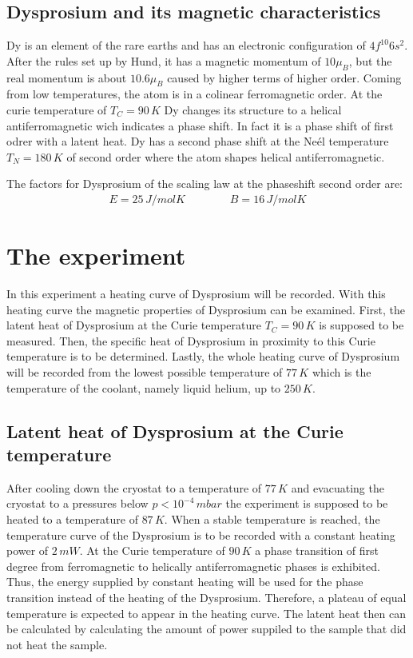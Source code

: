 \documentclass{include/thesisclass3}
\newcommand{\e}[1]{\,\si{#1}}
\begin{document}
\section{Dysprosium and its magnetic characteristics}
Dy is an element of the rare earths and has an electronic configuration of $4f^{10}6s^2$. After the rules set up by Hund, it has a magnetic momentum of $10\mu_B$, but the real momentum is about $10.6\mu_B$ caused by higher terms of higher order.
Coming from low temperatures, the atom is in a colinear ferromagnetic order. At the curie temperature of $T_C=90\e{K}$ Dy changes its structure to a helical antiferromagnetic wich indicates a phase shift. In fact it is a phase shift of first odrer with a latent heat. Dy has a second phase shift at the Neél temperature $T_N=180\e{K}$ of second order where the atom shapes helical antiferromagnetic.

The factors for Dysprosium of the scaling law at the phaseshift second order are:
\begin{align*}
E=25\e{J/mol K}\qquad \qquad B=16\e{J/mol K}
\end{align*}


\chapter{The experiment}
In this experiment a heating curve of Dysprosium will be recorded. 
With this heating curve the magnetic properties of Dysprosium can be examined.
First, the latent heat of Dysprosium at the Curie temperature $T_C = 90 \e{K}$ is supposed to be measured.
Then, the specific heat of Dysprosium in proximity to this Curie temperature is to be determined.
Lastly, the whole heating curve of Dysprosium will be recorded from the lowest possible temperature of $77\e{K}$ which is the temperature of the coolant, namely liquid helium, up to $250\e{K}$.

\section{Latent heat of Dysprosium at the Curie temperature}
After cooling down the cryostat to a temperature of $77\e{K}$ and evacuating the cryostat to a pressures below $p < 10^{-4}\e{mbar}$ the experiment is supposed to be heated to a temperature of $87\e{K}$. 
When a stable temperature is reached, the temperature curve of the Dysprosium is to be recorded with a constant heating power of $2\e{mW}$. 
At the Curie temperature of $90\e{K}$ a phase transition of first degree from ferromagnetic to helically antiferromagnetic phases is exhibited.
Thus, the energy supplied by constant heating will be used for the phase transition instead of the heating of the Dysprosium.
Therefore, a plateau of equal temperature is expected to appear in the heating curve.
The latent heat then can be calculated by calculating the amount of power suppiled to the sample that did not heat the sample.
\end{document}
